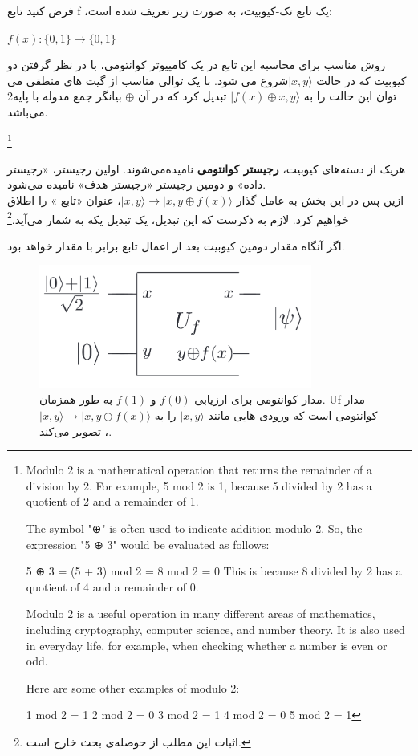 \documentclass{book}
\begin{document}
فرض کنید تابع f ،یک تابع تک-کیوبیت، به صورت زیر تعریف شده است:\\
\begin{center}
	$f (x) : \{0, 1\} \rightarrow \{0, 1\}$\\
\end{center}

روش مناسب برای محاسبه این تابع در یک کامپیوتر کوانتومی، با در نظر گرفتن دو کیوبیت که در حالت $\vert x, y\rangle$شروع می شود. با یک توالی مناسب از گیت های منطقی می توان این حالت را به $\vert f(x) \oplus x, y\rangle$ تبدیل کرد که در آن $\oplus$ بیانگر جمع مدوله با پایه‌2 می‌باشد.

\footnote{Modulo 2 is a mathematical operation that returns the remainder of a division by 2. For example, 5 mod 2 is 1, because 5 divided by 2 has a quotient of 2 and a remainder of 1.
	
	The symbol "⊕" is often used to indicate addition modulo 2. So, the expression "5 ⊕ 3" would be evaluated as follows:
	
	5 ⊕ 3 = (5 + 3) mod 2 = 8 mod 2 = 0
	This is because 8 divided by 2 has a quotient of 4 and a remainder of 0.
	
	Modulo 2 is a useful operation in many different areas of mathematics, including cryptography, computer science, and number theory. It is also used in everyday life, for example, when checking whether a number is even or odd.
	
	Here are some other examples of modulo 2:
	
	1 mod 2 = 1
	2 mod 2 = 0
	3 mod 2 = 1
	4 mod 2 = 0
	5 mod 2 = 1}

هریک از دسته‌های کیوبیت، \textbf{رجیستر کوانتومی} نامیده‌می‌شوند. اولین رجیستر، «رجیستر داده» و دومین رجیستر «رجیستر هدف» نامیده می‌شود.\\
ازین پس در این بخش به عامل گذار $\vert x, y \rangle \rightarrow \vert x, y \oplus f(x) \rangle$، عنوان «تابع » را اطلاق خواهیم کرد. لازم به ذکرست که این تبدیل، یک تبدیل یکه به شمار می‌آید.\footnote{اثبات این مطلب از حوصله‌ی بحث خارج است.}


اگر  آنگاه مقدار دومین کیوبیت بعد از اعمال تابع  برابر با مقدار  خواهد بود.

 \begin{center}
 	 \begin{figure}[ht]
 		\centering
 		\includegraphics[width=0.8\textwidth]{Uforacle.png}
 		\caption{مدار کوانتومی برای ارزیابی $f (0)$ و $f (1)$ به طور همزمان. Uf مدار کوانتومی است که ورودی هایی مانند $\vert x, y\rangle$ را به $\vert x, y \rangle \rightarrow \vert x, y \oplus f(x) \rangle$، تصویر می‌کند.}
 	\end{figure}
 \end{center}
\end{document}
